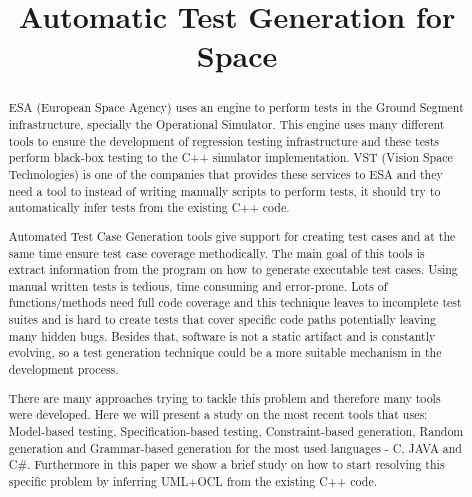 \documentclass[10pt, conference, compsocconf]{IEEEtran}
\begin{document}
\title{Automatic Test Generation for Space}

\author{
\and
{}
\and
{}
}

\maketitle

\begin{abstract}
ESA (European Space Agency) uses an engine to perform tests in the
Ground Segment infrastructure, specially the Operational Simulator.
This engine uses many different tools to ensure the development of
regression testing infrastructure and these tests perform black-box
testing to the C++ simulator implementation.
VST (Vision Space Technologies) is one of the companies that provides
these services to ESA and they need a tool to instead of writing
manually scripts to perform tests, it should try to automatically
infer tests from the existing C++ code.

Automated Test Case Generation tools give support for creating test
cases and at the same time ensure test case coverage methodically. The
main goal of this tools is extract information from the program on how
to generate executable test cases.
Using manual written tests is tedious, time consuming and error-prone.
Lots of functions/methods need full code coverage and this technique
leaves to incomplete test suites and is hard to create tests that
cover specific code paths potentially leaving many hidden bugs.
Besides that, software is not a static artifact and is constantly
evolving, so a test generation technique could be a more suitable
mechanism in the development process.

There are many approaches trying to tackle this problem and therefore
many tools were developed. Here we will present a study on the most
recent tools that uses: Model-based testing, Specification-based
testing, Constraint-based generation, Random generation and
Grammar-based generation for the most used languages - C, JAVA and C\#.
Furthermore in this paper we show a brief study on how to start resolving this specific problem by inferring UML+OCL from the existing C++ code.
\end{abstract}
\end{document}
